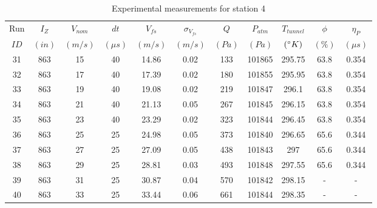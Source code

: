 \begin{table}[H]
\begin{center}
\begin{tabular}{|ccccccccccc|}
	\hline
	Run & $I_Z$ & $V_{nom}$ & $dt$ & $V_{fs}$ & $\sigma_{V_{fs}}$ & $Q$ & $P_{atm}$ & $T_{tunnel}$ & $\phi$ & $\eta_P$\\
	$ID$ & $(in)$ & $(m/s)$ & $(\mu s)$ & $(m/s)$ & $(m/s)$ & $(Pa)$ & $(Pa)$ & $(\degree K)$ & $(\%)$ & $(\mu s)$\\
	\hline
	31 & 863 & 15 & 40 & 14.86 & 0.02 & 133 & 101865 & 295.75 & 63.8 & 0.354\\
	32 & 863 & 17 & 40 & 17.39 & 0.02 & 180 & 101855 & 295.95 & 63.8 & 0.354\\
	33 & 863 & 19 & 40 & 19.08 & 0.02 & 219 & 101847 & 296.1 & 63.8 & 0.354\\
	34 & 863 & 21 & 40 & 21.13 & 0.05 & 267 & 101845 & 296.15 & 63.8 & 0.354\\
	35 & 863 & 23 & 40 & 23.29 & 0.02 & 323 & 101844 & 296.45 & 63.8 & 0.354\\
	36 & 863 & 25 & 25 & 24.98 & 0.05 & 373 & 101840 & 296.65 & 65.6 & 0.344\\
	37 & 863 & 27 & 25 & 27.09 & 0.05 & 438 & 101843 & 297 & 65.6 & 0.344\\
	38 & 863 & 29 & 25 & 28.81 & 0.03 & 493 & 101848 & 297.55 & 65.6 & 0.344\\
	39 & 863 & 31 & 25 & 30.87 & 0.04 & 570 & 101842 & 298.15 & - & -\\
	40 & 863 & 33 & 25 & 33.44 & 0.06 & 661 & 101844 & 298.35 & - & -\\
	\hline
\end{tabular}
\caption{Experimental measurements for station 4}
\label{table:station_4_measurements}
\end{center}
\end{table}
